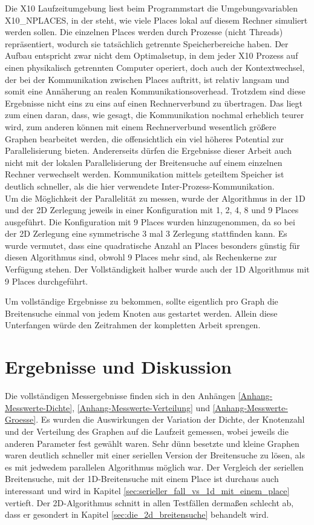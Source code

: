 Die X10 Laufzeitumgebung liest beim Programmstart die Umgebungsvariablen X10\_NPLACES, in der steht, wie viele Places lokal auf diesem Rechner simuliert werden sollen. Die einzelnen Places werden durch Prozesse (nicht Threads) repräsentiert, wodurch sie tatsächlich getrennte Speicherbereiche haben. Der Aufbau entspricht zwar nicht dem Optimalsetup, in dem jeder X10 Prozess auf einen physikalisch getrennten Computer operiert, doch auch der Kontextwechsel, der bei der Kommunikation zwischen Places auftritt, ist relativ langsam und somit eine Annäherung an realen Kommunikationsoverhead. Trotzdem sind diese Ergebnisse nicht eins zu eins auf einen Rechnerverbund zu übertragen. Das liegt zum einen daran, dass, wie gesagt, die Kommunikation nochmal erheblich teurer wird, zum anderen können mit einem Rechnerverbund wesentlich größere Graphen bearbeitet werden, die offensichtlich ein viel höheres Potential zur Parallelisierung bieten. Andererseits dürfen die Ergebnisse dieser Arbeit auch nicht mit der lokalen Parallelisierung der Breitensuche auf einem einzelnen Rechner verwechselt werden. Kommunikation mittels geteiltem Speicher ist deutlich schneller, als die hier verwendete Inter-Prozess-Kommunikation. \\
Um die Möglichkeit der Parallelität zu messen, wurde der Algorithmus in der 1D und der 2D Zerlegung jeweils in einer Konfiguration mit 1, 2, 4, 8 und 9 Places ausgeführt. Die Konfiguration mit 9 Places wurden hinzugenommen, da so bei der 2D Zerlegung eine symmetrische 3 mal 3 Zerlegung stattfinden kann. Es wurde vermutet, dass eine quadratische Anzahl an Places besonders günstig für diesen Algorithmus sind, obwohl 9 Places mehr sind, als Rechenkerne zur Verfügung stehen. Der Vollständigkeit halber wurde auch der 1D Algorithmus mit 9 Places durchgeführt.

Um vollständige Ergebnisse zu bekommen, sollte eigentlich pro Graph die Breitensuche einmal von jedem Knoten aus gestartet werden. Allein diese Unterfangen würde den Zeitrahmen der kompletten Arbeit sprengen.

\chapter{Ergebnisse und Diskussion} %
\label{cha:ergebnisse_und_diskussion}

Die vollständigen Messergebnisse finden sich in den Anhängen \ref{Anhang-Messwerte-Dichte}, \ref{Anhang-Messwerte-Verteilung} und \ref{Anhang-Messwerte-Groesse}. Es wurden die Auswirkungen der Variation der Dichte, der Knotenzahl und der Verteilung des Graphen auf die Laufzeit gemessen, wobei jeweils die anderen Parameter fest gewählt waren. Sehr dünn besetzte und kleine Graphen waren deutlich schneller mit einer seriellen Version der Breitensuche zu lösen, als es mit jedwedem parallelen Algorithmus möglich war. Der Vergleich der seriellen Breitensuche, mit der 1D-Breitensuche mit einem Place ist durchaus auch interessant und wird in Kapitel \ref{sec:serieller_fall_vs_1d_mit_einem_place} vertieft. Der 2D-Algorithmus schnitt in allen Testfällen dermaßen schlecht ab, dass er gesondert in Kapitel \ref{sec:die_2d_breitensuche} behandelt wird.

